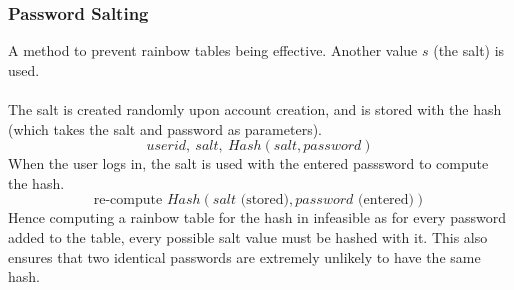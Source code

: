 \documentclass{report}
\begin{document}
{            \subsubsection*{Password Salting}{
                A method to prevent rainbow tables being effective. Another value $s$ (the salt) is used.
                \\
                \\ The salt is created randomly upon account creation, and is stored with the hash (which takes the salt and password as parameters).
                \[userid, \ salt, \ Hash(salt, password)\]
                When the user logs in, the salt is used with the entered passsword to compute the hash.
                \[\text{re-compute } Hash(salt \text{ (stored)}, password \text{ (entered)})\]
                Hence computing a rainbow table for the hash in infeasible as for every password added to the table, every possible salt value must be hashed with it. This also ensures that two identical passwords are extremely unlikely to have the same hash.

}}
\end{document}

